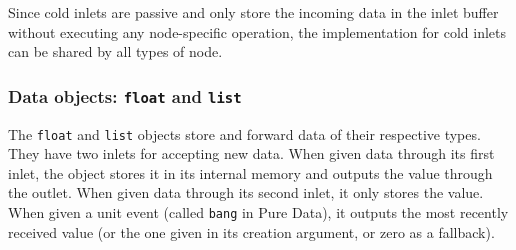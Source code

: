 Since cold inlets are passive and only store the incoming data in the inlet
buffer without executing any node-specific operation, the implementation for
cold inlets can be shared by all types of node.

\resethooks

\subsubsection{Data objects: \texttt{float} and \texttt{list}}

The \texttt{float} and \texttt{list} objects store and forward data of their
respective types. They have two inlets for accepting new data. When given data
through its first inlet, the object stores it in its internal memory and
outputs the value through the outlet. When given data through its second
inlet, it only stores the value. When given a unit event (called \texttt{bang}
in Pure Data), it outputs the most recently received value (or the one given
in its creation argument, or zero as a fallback).

